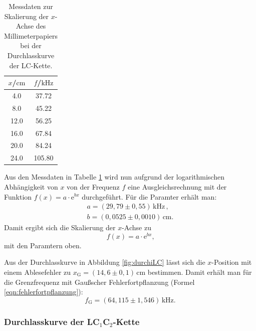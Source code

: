 \begin{table}
	\caption{Messdaten zur Skalierung der $x$-Achse des Millimeterpapiers bei der
	Durchlasskurve der LC-Kette.}
	\label{tab:skalaLC}
	\centering
	\begin{tabular}{cc}
		\toprule
		$x$/$\si{\centi\meter}$ & $f$/$\si{\kilo\hertz}$ \\
		\midrule
		4.0                     & 37.72                  \\
		8.0                     & 45.22                  \\
		12.0                    & 56.25                  \\
		16.0                    & 67.84                  \\
		20.0                    & 84.24                  \\
		24.0                    & 105.80                 \\
		\bottomrule
	\end{tabular}
\end{table}
Aus den Messdaten in Tabelle \ref{tab:skalaLC} wird nun aufgrund der logarithmischen 
Abhängigkeit von $x$ von der Frequenz $f$ eine Ausgleichsrechnung mit der Funktion 
$f(x) = a \cdot \mathrm{e}^{bx}$ durchgeführt. 
Für die Paramter erhält man:
\begin{gather*}
	a = (29,79 \pm 0,55) \, \si{\kilo\hertz} \, \text{,}  \\
	b = (0,0525 \pm 0,0010) \, \si{\centi\meter} \text{.}
\end{gather*}
Damit ergibt sich die Skalierung der $x$-Achse zu 
\begin{equation}
	f(x) = a \cdot \mathrm{e}^{bx} \text{,}
\end{equation}
mit den Paramtern oben.

Aus der Durchlasskurve in Abbildung \ref{fig:durchiLC} lässt sich die $x$-Position mit einem 
Ablesefehler zu $x_{\text{G}} = (14,6 \pm 0,1) \, \si{\centi\meter}$ bestimmen.
Damit erhält man für die Grenzfrequenz mit Gaußscher Fehlerfortpflanzung (Formel 
\eqref{eqn:fehlerfortpflanzung}):
\begin{equation*}
	f_{\text{G}} = (64,115 \pm 1,546 ) \, \si{\kilo\hertz} \text{.} 
\end{equation*}


\FloatBarrier
\subsubsection{Durchlasskurve der LC$_1$C$_2$-Kette}

